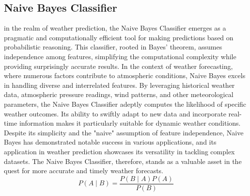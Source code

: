 \documentclass[conference]{IEEEtran}
\begin{document}
\subsection{\textbf{Naive Bayes Classifier}}
in the realm of weather prediction, the Naive Bayes Classifier emerges as a pragmatic and computationally efficient tool for making predictions based on probabilistic reasoning. This classifier, rooted in Bayes' theorem, assumes independence among features, simplifying the computational complexity while providing surprisingly accurate results. In the context of weather forecasting, where numerous factors contribute to atmospheric conditions, Naive Bayes excels in handling diverse and interrelated features. By leveraging historical weather data, atmospheric pressure readings, wind patterns, and other meteorological parameters, the Naive Bayes Classifier adeptly computes the likelihood of specific weather outcomes. Its ability to swiftly adapt to new data and incorporate real-time information makes it particularly suitable for dynamic weather conditions. Despite its simplicity and the "naive" assumption of feature independence, Naive Bayes has demonstrated notable success in various applications, and its application in weather prediction showcases its versatility in tackling complex datasets. The Naive Bayes Classifier, therefore, stands as a valuable asset in the quest for more accurate and timely weather forecasts.
\\ \[ P(A \mid B) = \frac{P(B \mid A) P(A)}{P(B)} \]
\end{document}
